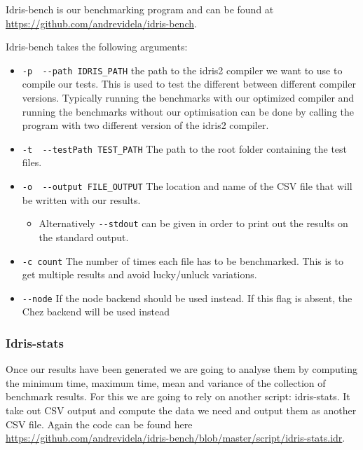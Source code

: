 \documentclass[
]{article}
\providecommand{\tightlist}{%
  \setlength{\itemsep}{0pt}\setlength{\parskip}{0pt}}
\begin{document}
Idris-bench is our benchmarking program and can be found at
\url{https://github.com/andrevidela/idris-bench}.

Idris-bench takes the following arguments:

\begin{itemize}
\tightlist
\item
  \texttt{-p\ \textbar{}\ -\/-path\ IDRIS\_PATH} the path to the idris2
  compiler we want to use to compile our tests. This is used to test the
  different between different compiler versions. Typically running the
  benchmarks with our optimized compiler and running the benchmarks
  without our optimisation can be done by calling the program with two
  different version of the idris2 compiler.
\item
  \texttt{-t\ \textbar{}\ -\/-testPath\ TEST\_PATH} The path to the root
  folder containing the test files.
\item
  \texttt{-o\ \textbar{}\ -\/-output\ FILE\_OUTPUT} The location and
  name of the CSV file that will be written with our results.

  \begin{itemize}
  \tightlist
  \item
    Alternatively \texttt{-\/-stdout} can be given in order to print out
    the results on the standard output.
  \end{itemize}
\item
  \texttt{-c\ count} The number of times each file has to be
  benchmarked. This is to get multiple results and avoid lucky/unluck
  variations.
\item
  \texttt{-\/-node} If the node backend should be used instead. If this
  flag is absent, the Chez backend will be used instead
\end{itemize}

\hypertarget{idris-stats}{%
\subsubsection{Idris-stats}\label{idris-stats}}

Once our results have been generated we are going to analyse them by
computing the minimum time, maximum time, mean and variance of the
collection of benchmark results. For this we are going to rely on
another script: idris-stats. It take out CSV output and compute the data
we need and output them as another CSV file. Again the code can be found
here
\url{https://github.com/andrevidela/idris-bench/blob/master/script/idris-stats.idr}.
\end{document}
